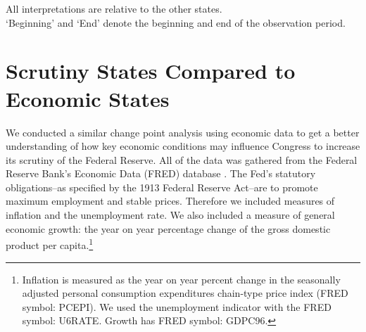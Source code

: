 \documentclass[a4paper]{article}\usepackage[]{graphicx}\usepackage[]{color}
\begin{document}
\begin{table}
    \caption{Summary of Estimated Scrutiny States}
    \label{ObservedTable}

    {\scriptsize{All interpretations are relative to the other states. \\
    `Beginning' and `End' denote the beginning and end of the observation period.}}
\end{table}

\section{Scrutiny States Compared to Economic States}

We conducted a similar change point analysis using economic data to get a better understanding of how key economic conditions may influence Congress to increase its scrutiny of the Federal Reserve. All of the data was gathered from the Federal Reserve Bank's Economic Data (FRED) database \citep{FRED}. The Fed's statutory obligations--as specified by the 1913 Federal Reserve Act--are to promote maximum employment and stable prices. Therefore we included measures of inflation and the unemployment rate. We also included a measure of general economic growth: the year on year percentage change of the gross domestic product per capita.\footnote{Inflation is measured as the year on year percent change in the seasonally adjusted personal consumption expenditures chain-type price index (FRED symbol: PCEPI). We used the unemployment indicator with the FRED symbol: U6RATE. Growth has FRED symbol: GDPC96.}
\end{document}
